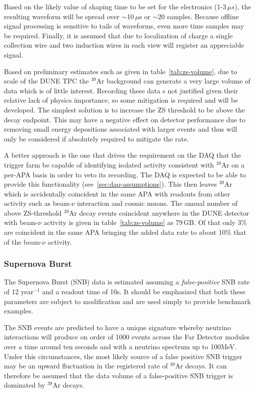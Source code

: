 Based on the likely value of shaping time to be set for the electronics (1-3\,${\mu}s$),
the resulting waveform will be spread over $\sim$10\,$\mu$s or $\sim$20 samples. Because offline signal
processing is sensitive to tails of waveforms, even more time samples may be required.
Finally, it is assumed that due to localization of charge a single collection wire and two induction
wires in each view will register an appreciable signal.

Based on preliminary estimates such as given in table~\ref{tab:zs-volume},
due to scale of the DUNE TPC the $^{39}$Ar background can generate a very large volume
of data which is of little interest. Recording these data s not justified given their relative lack
of physics importance, so some mitigation is required and will be developed. The simplest solution
is to increase the ZS threshold to be above the decay endpoint.
This may have a negative effect on detector performance due to removing small energy
depositions associated with larger events and thus will only be
considered if absolutely required to mitigate the rate.

A better approach is the one that drives the requirement on the DAQ
that the trigger farm be capable of identifying isolated activity
consistent with $^{39}$Ar on a per-APA basis in order to veto its
recording. The DAQ is expected to be able to provide this functionality
(see~\ref{sec:daq-assumptions}).
This then leaves $^{39}$Ar which is accidentally coincident in the
same APA with readouts from other activity such as beam-$\nu$
interaction and cosmic muons.
The annual number of above ZS-threshold $^{39}$Ar decay events
coincident anywhere in the DUNE detector with beam-$\nu$ activity is
given in table~\ref{tab:zs-volume} as 79\,GB. Of that only 3\% are coincident
in the same APA bringing the added data rate to about 10\% that of the beam-$\nu$ activity.

\subsubsection{Supernova Burst}

The Supernova Burst (SNB) data is estimated assuming a
\textit{false-positive} SNB rate of 12 year$^{-1}$ and a readout time of
10s. It should be emphasized that both these parameters are subject to
modification and are used simply to provide benchmark examples.

The SNB events are predicted to have a unique signature whereby
neutrino interactions will produce on order of 1000 events across
the Far Detector modules over a time around ten seconds and with a
neutrino spectrum up to 100MeV. Under this circumstances, 
the most likely source of a false positive SNB trigger may be an upward
fluctuation in the registered rate of $^{39}$Ar decays.
It can therefore be assumed that the data volume of a
false-positive SNB trigger is dominated by $^{39}$Ar decays.


